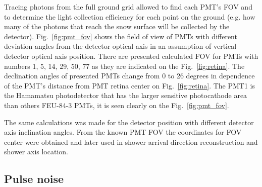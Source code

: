 \documentclass[final,5p,times,twocolumn]{elsarticle}
\begin{document}
Tracing photons from the full ground grid allowed to find each PMT's FOV and to determine the light collection efficiency for each point on the ground (e.g. how many of the photons that reach the snow surface will be collected by the detector).
Fig.~\ref{fig:pmt_fov} shows the field of view of PMTs with different deviation angles  from the detector optical axis in an assumption of vertical detector optical axis position. There are presented calculated FOV for PMTs with numbers 1, 5, 14, 29, 50, 77 as they are indicated on the Fig.~\ref{fig:retina}. The declination angles of presented PMTs change from 0 to 26 degrees in dependence of the PMT's distance from PMT retina center on Fig.~\ref{fig:retina}. The PMT1 is the Hamamatsu photodetector that has the larger sensitive photocathode area than others FEU-84-3 PMTs, it is seen clearly on the Fig.~\ref{fig:pmt_fov}. 

The same calculations was made for the detector position with different detector axis inclination angles. From the known PMT FOV the coordinates for FOV center were obtained and later used in shower arrival direction reconstruction and shower axis location.

\subsection{Pulse noise}
\end{document}
